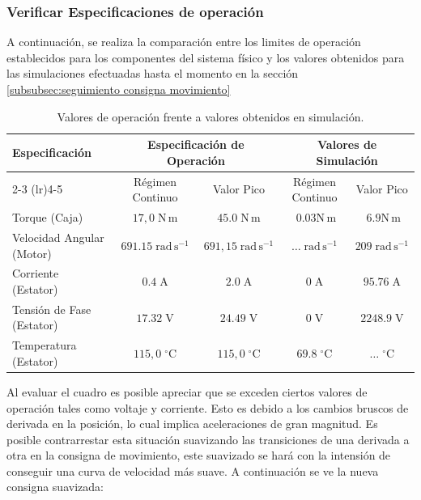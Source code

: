 \documentclass[blue,fullpaper]{ludusofficial}  %
\begin{document}
\subsubsection{Verificar Especificaciones de operación }
A continuación, se realiza la comparación entre los limites de operación establecidos para los
componentes del sistema físico y los valores obtenidos para las simulaciones efectuadas hasta
el momento en la sección \ref{subsubsec:seguimiento consigna movimiento} 
\begin{table}[!htbp]
    \centering
    \small
    \caption{Valores de operación frente a valores obtenidos en simulación.}
    \label{tab:verificacion-operacion}
    \begin{tabular}{l c c c c}
        \toprule
        \multirow{2}{*}{\textbf{Especificación}} & \multicolumn{2}{c}{\textbf{Especificación de Operación}} & \multicolumn{2}{c}{\textbf{Valores de Simulación}} \\
        \cmidrule(lr){2-3} \cmidrule(lr){4-5}
         & Régimen Continuo & Valor Pico & Régimen Continuo & Valor Pico \\
        \midrule
        Torque (Caja) & $17,0\;\mathrm{N\,m}$ & $45.0\;\mathrm{N\,m}$ & $\;\mathrm{0.03N\,m}$ & $\;\mathrm{6.9N\,m}$ \\
        Velocidad Angular (Motor) & $691.15\;\mathrm{rad\,s^{-1}}$ & $691,15\;\mathrm{rad\,s^{-1}}$ & $\dots\;\mathrm{rad\,s^{-1}}$ & $209\;\mathrm{rad\,s^{-1}}$ \\
        Corriente (Estator) & $0.4\;\mathrm{A}$ & $2.0\;\mathrm{A}$ & $0\;\mathrm{A}$ & $95.76\;\mathrm{A}$ \\
        Tensión de Fase (Estator) & $17.32\;\mathrm{V}$ & $24.49\;\mathrm{V}$ & $0\;\mathrm{V}$ & $2248.9\;\mathrm{V}$ \\
        Temperatura (Estator) & $115,0\;^\circ\mathrm{C}$ & $115,0\;^\circ\mathrm{C}$ & $69.8\;^\circ\mathrm{C}$ & $\dots\;^\circ\mathrm{C}$ \\
        \bottomrule
    \end{tabular}
\end{table}
Al evaluar el cuadro es posible apreciar que se exceden ciertos valores de operación tales como voltaje y corriente. Esto es debido a los cambios bruscos de derivada en la posición, lo cual implica aceleraciones de gran magnitud. Es posible contrarrestar esta situación suavizando las transiciones de una derivada a otra en la consigna de movimiento, este suavizado se hará con la intensión de conseguir una curva de velocidad más suave. 
A continuación se ve la nueva consigna suavizada:
\end{document}

